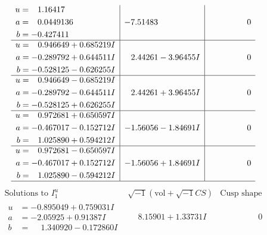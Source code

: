 \documentclass[1p]{elsarticle_modified}
\theoremstyle{definition}
\newcommand{\I}{\sqrt{-1}}
\begin{document}
$$\begin{array}{c|c|c}
\begin{aligned}
u &= \phantom{-}1.16417\phantom{ +0.000000I} \\
a &= \phantom{-}0.0449136\phantom{ +0.000000I} \\
b &= -0.427411\phantom{ +0.000000I}\end{aligned}
 & -7.51483\phantom{ +0.000000I} & \phantom{-0.000000 } 0 \\ \hline\begin{aligned}
u &= \phantom{-}0.946649 + 0.685219 I \\
a &= -0.289792 + 0.644511 I \\
b &= -0.528125 - 0.626255 I\end{aligned}
 & \phantom{-}2.44261 - 3.96455 I & \phantom{-0.000000 } 0 \\ \hline\begin{aligned}
u &= \phantom{-}0.946649 - 0.685219 I \\
a &= -0.289792 - 0.644511 I \\
b &= -0.528125 + 0.626255 I\end{aligned}
 & \phantom{-}2.44261 + 3.96455 I & \phantom{-0.000000 } 0 \\ \hline\begin{aligned}
u &= \phantom{-}0.972681 + 0.650597 I \\
a &= -0.467017 - 0.152712 I \\
b &= \phantom{-}1.025890 + 0.594212 I\end{aligned}
 & -1.56056 - 1.84691 I & \phantom{-0.000000 } 0 \\ \hline\begin{aligned}
u &= \phantom{-}0.972681 - 0.650597 I \\
a &= -0.467017 + 0.152712 I \\
b &= \phantom{-}1.025890 - 0.594212 I\end{aligned}
 & -1.56056 + 1.84691 I & \phantom{-0.000000 } 0\\
 \hline 
 \end{array}$$\newpage$$\begin{array}{c|c|c}  
\text{Solutions to }I^u_{1}& \I (\text{vol} + \sqrt{-1}CS) & \text{Cusp shape}\\
 \hline 
\begin{aligned}
u &= -0.895049 + 0.759031 I \\
a &= -2.05925 + 0.91387 I \\
b &= \phantom{-}1.340920 - 0.172860 I\end{aligned}
 & \phantom{-}8.15901 + 1.33731 I & \phantom{-0.000000 } 0 \\ \hline\begin{aligned}

\end{aligned}
\end{array}$$
\end{document}
